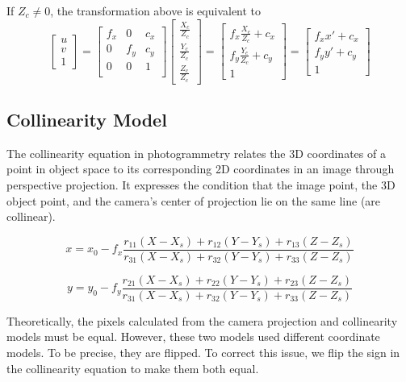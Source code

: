 If $Z_c \neq 0$, the transformation above is equivalent to
\[
\begin{bmatrix}
    u \\ v \\ 1
\end{bmatrix} =
\begin{bmatrix}
    f_x & 0 & c_x \\
    0  & f_y& c_y \\
    0  & 0 &  1  \\
\end{bmatrix}
\begin{bmatrix}
    \frac{X_c}{Z_c} \\ \frac{Y_c}{Z_c} \\ \frac{Z_c}{Z_c}
\end{bmatrix} =
\begin{bmatrix}
    f_x \frac{X_c}{Z_c} + c_x \\
    f_y \frac{Y_c}{Z_c} + c_y \\
    1
\end{bmatrix} =
\begin{bmatrix}
    f_x x' + c_x\\
    f_y y' + c_y \\
    1
\end{bmatrix}
\]

\subsection{Collinearity Model}

The collinearity equation in photogrammetry relates the 3D coordinates of a point in object space to its corresponding 2D coordinates in an image through perspective projection. It expresses the condition that the image point, the 3D object point, and the camera's center of projection lie on the same line (are collinear).

\[
x = x_0 - f_x\frac{r_{11}(X - X_s) + r_{12}(Y - Y_s) + r_{13}(Z - Z_s)}{r_{31}(X - X_s) + r_{32}(Y - Y_s) + r_{33}(Z - Z_s)}
\]

\[
y = y_0 - f_y\frac{r_{21}(X - X_s) + r_{22}(Y - Y_s) + r_{23}(Z - Z_s)}{r_{31}(X - X_s) + r_{32}(Y - Y_s) + r_{33}(Z - Z_s)}
\]

Theoretically, the pixels calculated from the camera projection and collinearity models must be equal. However, these two models used different coordinate models. To be precise, they are flipped. To correct this issue, we flip the sign in the collinearity equation to make them both equal.

